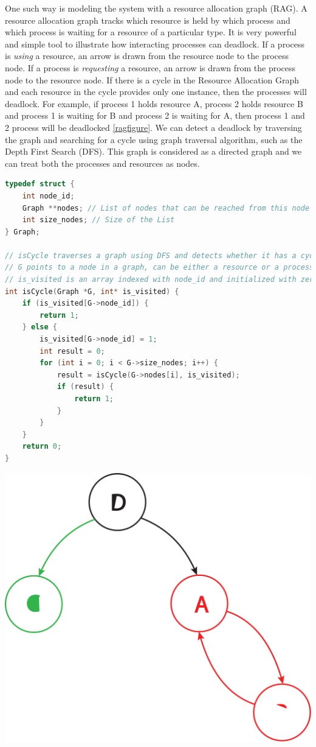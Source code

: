 One such way is modeling the system with a resource allocation graph (\gls{RAG}). A resource allocation graph tracks which resource is held by which process and which process is waiting for a resource of a particular type. It is very powerful and simple tool to illustrate how interacting processes can deadlock. If a process is \emph{using} a resource, an arrow is drawn from the resource node to the process node. If a process is \emph{requesting} a resource, an arrow is drawn from the process node to the resource node. If there is a cycle in the Resource Allocation Graph and each resource in the cycle provides only one instance, then the processes will deadlock. For example, if process 1 holds resource A, process 2 holds resource B and process 1 is waiting for B and process 2 is waiting for A, then process 1 and 2 process will be deadlocked \ref{ragfigure}. We can detect a deadlock by traversing the graph and searching for a cycle using graph traversal algorithm, such as the Depth First Search (DFS). This graph is considered as a directed graph and we can treat both the processes and resources as nodes.  

\begin{lstlisting}[language=C]
typedef struct {
	int node_id; 
	Graph **nodes; // List of nodes that can be reached from this node
	int size_nodes; // Size of the List
} Graph;

// isCycle traverses a graph using DFS and detects whether it has a cycle
// G points to a node in a graph, can be either a resource or a process
// is_visited is an array indexed with node_id and initialized with zeroes to record whether a particular node has been visited
int isCycle(Graph *G, int* is_visited) {
	if (is_visited[G->node_id]) {
		return 1;
	} else {
		is_visited[G->node_id] = 1;
		int result = 0;
		for (int i = 0; i < G->size_nodes; i++) {
			result = isCycle(G->nodes[i], is_visited);
			if (result) {
				return 1;
			}
		}
	}
	return 0;
}
\end{lstlisting}

\begin{center}
\includegraphics[width=.25\textwidth]{deadlock/images/colorful.png}
  \caption{Graph based Deadlock}
\end{center}

